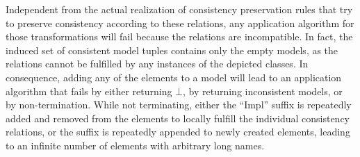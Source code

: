 Independent from the actual realization of consistency preservation rules that try to preserve consistency according to these relations, any application algorithm for those transformations will fail because the relations are incompatible.
In fact, the induced set of consistent model tuples contains only the empty models, as the relations cannot be fulfilled by any instances of the depicted classes.
In consequence, adding any of the elements to a model will lead to an application algorithm that fails by either returning $\bot$, by returning inconsistent models, or by non-termination.
While not terminating, either the \enquote{Impl} suffix is repeatedly added and removed from the elements to locally fulfill the individual consistency relations, or the suffix is repeatedly appended to newly created elements, leading to an infinite number of elements with arbitrary long names.

